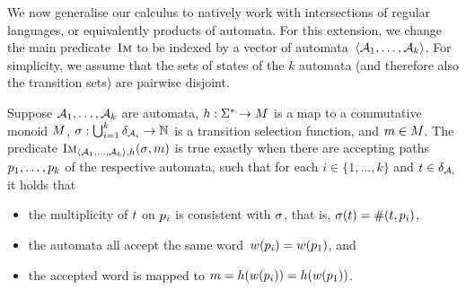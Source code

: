 
We now generalise our calculus to natively work with intersections of
regular languages, or equivalently products of automata. For this
extension, we change the main predicate~$\operatorname{\textsc{Im}}$ to be indexed by a
vector of automata~$\left\langle\mathcal{A}_1, \ldots, \mathcal{A}_k\right\rangle$.  For
simplicity, we assume that the sets of states of the $k$ automata (and
therefore also the transition sets) are pairwise disjoint. 
\begin{definition}\label{def:multiple}
  Suppose $\mathcal{A}_1, \ldots, \mathcal{A}_k$ are automata,
  $h : \Sigma^* \to M$ is a map to a commutative monoid
  $M$,
  $\operatorname{\sigma}: \bigcup_{i=1}^k \delta_{\mathcal{A}_i} \to \mathbb{N}$
  is a transition selection function, and
  $m \in M$. The predicate
  $\operatorname{\textsc{Im}}_{\left\langle\mathcal{A}_1, \ldots,
      \mathcal{A}_k\right\rangle, h}(\operatorname{\sigma}, m)$ is true exactly
  when there are accepting paths~$p_1, \ldots, p_k$ of the
  respective automata, such that for each $i \in \{1, \ldots, k\}$ and
  $t \in \delta_{\mathcal{A}_i}$ it holds that
  \begin{itemize}
  \item the multiplicity of $t$ on $p_i$ is consistent with
    $\operatorname{\sigma}$, that is,
    $\operatorname{\sigma}(t) = \operatorname{\#}(t, p_i)$,
  \item the automata all accept the same
    word~$w(p_i) = w(p_1)$, and
  \item the accepted word is mapped to
    $m = h(w(p_i)) =
    h(w(p_1))$.
  \end{itemize}
\end{definition}

